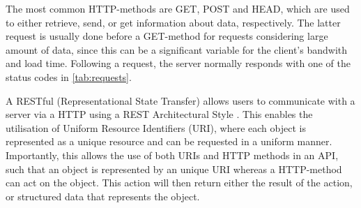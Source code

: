 \begin{table}[!ht]
\centering
\caption{Numeric status code for response. The leftmost digit decides the type of response, while the two follow-up digits depend on the implemented API.}
\label{tab:requests}
\noindent{}
\end{table}

The most common HTTP-methods are GET, POST and HEAD, which are used to either retrieve, send, or get information about data, respectively. The latter request is usually done before a GET-method for requests considering large amount of data, since this can be a significant variable for the client's bandwith and load time. Following a request, the server normally responds with one of the status codes in \autoref{tab:requests}.



A RESTful (Representational State Transfer) allows users to communicate with a server via a HTTP using a REST Architectural Style \cite{Battle2008}. This enables the utilisation of Uniform Resource Identifiers (URI), where each object is represented as a unique resource and can be requested in a uniform manner. Importantly, this allows the use of both URIs and HTTP methods in an API, such that an object is represented by an unique URI whereas a HTTP-method can act on the object. This action will then return either the result of the action, or structured data that represents the object.



